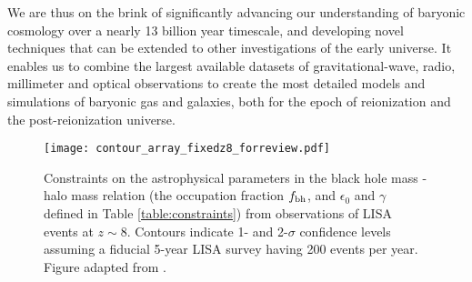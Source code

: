 We are thus on the brink of significantly advancing our understanding of baryonic cosmology over a nearly 13 billion year timescale, and developing novel techniques that can be extended to other investigations of the early universe. It enables us to combine the largest available datasets of gravitational-wave, radio, millimeter and optical observations to create the most detailed models and simulations of baryonic gas and galaxies, both for the epoch of reionization and the post-reionization universe.


\begin{figure}
\begin{center}
\texttt{[image: contour\_array\_fixedz8\_forreview.pdf]}
\end{center}
\label{fig:multimessenger}
\caption{Constraints on the astrophysical parameters in the black hole mass - halo mass relation (the occupation fraction $f_{\rm bh}$, and $\epsilon_0$ and $\gamma$ defined in Table \ref{table:constraints}) from observations of LISA events at $z \sim 8$. Contours indicate 1- and 2-$\sigma$ confidence levels assuming a fiducial 5-year LISA survey having 200 events per year. Figure adapted from \cite{hploeblisa2020c}.}
\end{figure}
